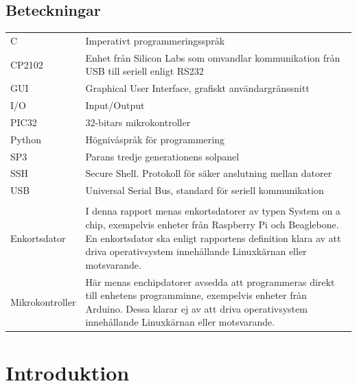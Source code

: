 \documentclass{article}
\begin{document}
    \subsection*{Beteckningar} %
    \label{sub:beteckningar}
        \begin{tabularx}{\textwidth}{@{}lX}
            C & Imperativt programmeringsspråk \\
            CP2102 & Enhet från Silicon Labs som omvandlar kommunikation från
            USB till seriell enligt RS232\\
            GUI & Graphical User Interface, grafiskt användargränssnitt \\
            I/O & Input/Output \\
            PIC32 & 32-bitars mikrokontroller \\
            Python & Högnivåspråk för programmering \\
            SP3 & Parans tredje generationens solpanel \\
            SSH & Secure Shell. Protokoll för säker anslutning mellan datorer\\
            USB & Universal Serial Bus, standard för seriell kommunikation \\
            \\
            Enkortsdator & I denna rapport menas enkortsdatorer av typen System
            on a chip, exempelvis enheter från Raspberry Pi och Beagle\-bone. 
            En enkortsdator ska enligt rapportens definition klara av att driva 
            operativsystem innehållande Linuxkärnan eller mot\-svarande. \\
            Mikrokontroller & Här menas enchipdatorer avsedda att programmeras 
            direkt till enhetens programminne, exempelvis enheter från 
            \hbox{Arduino}. Dessa klarar ej av att driva operativsystem 
            innehållande Linux\-kärnan eller motsvarande.\\
            

        \end{tabularx}
    \newpage

    \tableofcontents

    \newpage

    \section{Introduktion} %
    \label{sec:introduktion}
\end{document}
